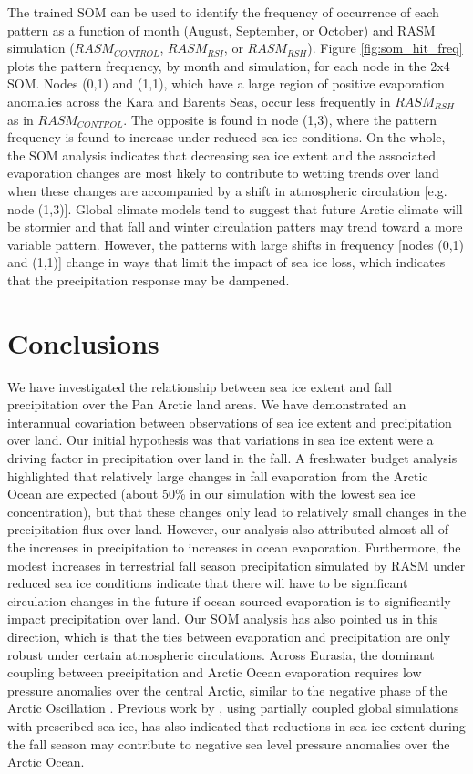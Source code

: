 \documentclass[draft,linenumbers]{agujournal}
\begin{document}
The trained SOM can be used to identify the frequency of occurrence of each pattern as a function of month (August, September, or October) and RASM simulation ($RASM_{CONTROL}$, $RASM_{RSI}$, or $RASM_{RSH}$).
Figure \ref{fig:som_hit_freq} plots the pattern frequency, by month and simulation, for each node in the 2x4 SOM.
Nodes (0,1) and (1,1), which have a large region of positive evaporation anomalies across the Kara and Barents Seas, occur less frequently in $RASM_{RSH}$ as in $RASM_{CONTROL}$.
The opposite is found in node (1,3), where the pattern frequency is found to increase under reduced sea ice conditions.
On the whole, the SOM analysis indicates that decreasing sea ice extent and the associated evaporation changes are most likely to contribute to wetting trends over land when these changes are accompanied by a shift in atmospheric circulation [e.g. node (1,3)].
Global climate models tend to suggest that future Arctic climate will be stormier \citep{Vavrus_2012} and that fall and winter circulation patters may trend toward a more variable pattern.
However, the patterns with large shifts in frequency [nodes (0,1) and (1,1)] change in ways that limit the impact of sea ice loss, which indicates that the precipitation response may be dampened.

\section{Conclusions}
\label{sec:conclusions_ch5}
We have investigated the relationship between sea ice extent and fall precipitation over the Pan Arctic land areas.
We have demonstrated an interannual covariation between observations of sea ice extent and precipitation over land.
Our initial hypothesis was that variations in sea ice extent were a driving factor in precipitation over land in the fall.
A freshwater budget analysis highlighted that relatively large changes in fall evaporation from the Arctic Ocean are expected (about 50\% in our simulation with the lowest sea ice concentration), but that these changes only lead to relatively small changes in the precipitation flux over land.
However, our analysis also attributed almost all of the increases in precipitation to increases in ocean evaporation.
Furthermore, the modest increases in terrestrial fall season precipitation simulated by RASM under reduced sea ice conditions indicate that there will have to be significant circulation changes in the future if ocean sourced evaporation is to significantly impact precipitation over land.
Our SOM analysis has also pointed us in this direction, which is that the ties between evaporation and precipitation are only robust under certain atmospheric circulations.
Across Eurasia, the dominant coupling between precipitation and Arctic Ocean evaporation requires low pressure anomalies over the central Arctic, similar to the negative phase of the Arctic Oscillation \citep{Thompson_1998}.
Previous work by \citet{Cassano_2014}, using partially coupled global simulations with prescribed sea ice, has also indicated that reductions in sea ice extent during the fall season may contribute to negative sea level pressure anomalies over the Arctic Ocean.
\end{document}
